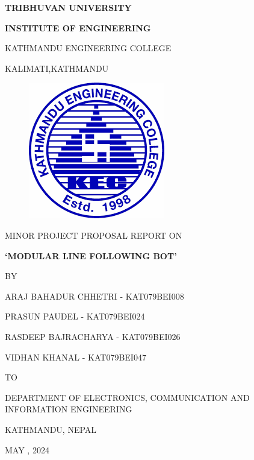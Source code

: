 \begin{titlepage}
    \thispagestyle{empty}
    \begin{center}
    
    \vspace*{\fill} %
    \vspace*{-1cm}
    {\large \textbf{TRIBHUVAN UNIVERSITY
}\par}
{\large \textbf{INSTITUTE OF ENGINEERING
}\par}
\vspace{8pt}
KATHMANDU ENGINEERING COLLEGE

KALIMATI,KATHMANDU
\vspace{24pt}

\begin{figure}[ht]
    \centering
    \includegraphics[scale=0.45]{images/kec.png}
\end{figure}
\vspace{24pt}
{MINOR PROJECT PROPOSAL REPORT ON\par}
\vspace{14pt}

{\textbf{ `MODULAR LINE FOLLOWING BOT'}\par}



\vspace{14pt}
{BY\par}
\vspace{14pt}

{ ARAJ BAHADUR CHHETRI - KAT079BEI008\par}
{ PRASUN PAUDEL - KAT079BEI024\par}
{RASDEEP BAJRACHARYA - KAT079BEI026\par}
{VIDHAN KHANAL - KAT079BEI047\par}

\vspace{24pt}
{TO\par}
\vspace{14pt}
{DEPARTMENT OF ELECTRONICS, COMMUNICATION AND INFORMATION ENGINEERING\par}
{KATHMANDU, NEPAL\par}
{MAY , 2024\par}


    \end{center}
\end{titlepage}